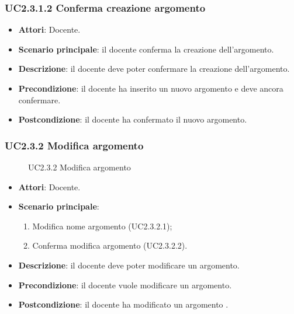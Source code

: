 \subsubsection{UC2.3.1.2 Conferma creazione argomento}
\begin{itemize}
\item \textbf{Attori}: Docente.
\item \textbf{Scenario principale}: il docente conferma la creazione dell'argomento.
\item \textbf{Descrizione}: il docente deve poter confermare la creazione dell'argomento.
\item \textbf{Precondizione}: il docente ha inserito un nuovo argomento e deve ancora confermare.
\item \textbf{Postcondizione}: il docente ha confermato il nuovo argomento.
\end{itemize}
\subsubsection{UC2.3.2 Modifica argomento}
\begin{figure}[H]
\centering
\noindent{}
\caption{UC2.3.2 Modifica argomento}
\end{figure}
\begin{itemize}
\item \textbf{Attori}: Docente.
\item \textbf{Scenario principale}:
\begin{enumerate}
\item Modifica nome argomento (UC2.3.2.1);
\item Conferma modifica argomento (UC2.3.2.2).
\end{enumerate}
\item \textbf{Descrizione}: il docente deve poter modificare un argomento.
\item \textbf{Precondizione}: il docente vuole modificare un argomento.
\item \textbf{Postcondizione}: il docente ha modificato un argomento .
\end{itemize}
